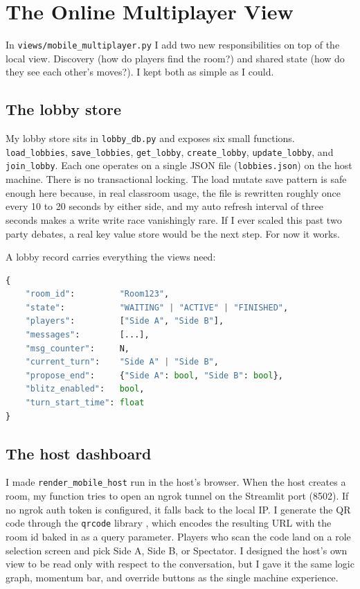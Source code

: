 \section{The Online Multiplayer View}
\label{sec:impl_online}
In \texttt{views/mobile\_multiplayer.py} I add two new responsibilities on top of the local view. Discovery (how do players find the room?) and shared state (how do they see each other's moves?). I kept both as simple as I could.

\subsection{The lobby store}
My lobby store sits in \texttt{lobby\_db.py} and exposes six small functions. \texttt{load\_lobbies}, \texttt{save\_lobbies}, \texttt{get\_lobby}, \texttt{create\_lobby}, \texttt{update\_lobby}, and \texttt{join\_lobby}. Each one operates on a single JSON file (\texttt{lobbies.json}) on the host machine. There is no transactional locking. The load mutate save pattern is safe enough here because, in real classroom usage, the file is rewritten roughly once every 10 to 20 seconds by either side, and my auto refresh interval of three seconds makes a write write race vanishingly rare. If I ever scaled this past two party debates, a real key value store would be the next step. For now it works.

A lobby record carries everything the views need:
\begin{lstlisting}[language=Python]
{
    "room_id":         "Room123",
    "state":           "WAITING" | "ACTIVE" | "FINISHED",
    "players":         ["Side A", "Side B"],
    "messages":        [...],
    "msg_counter":     N,
    "current_turn":    "Side A" | "Side B",
    "propose_end":     {"Side A": bool, "Side B": bool},
    "blitz_enabled":   bool,
    "turn_start_time": float
}
\end{lstlisting}

\subsection{The host dashboard}
I made \texttt{render\_mobile\_host} run in the host's browser. When the host creates a room, my function tries to open an ngrok tunnel \cite{ngrok2024} on the Streamlit port (8502). If no ngrok auth token is configured, it falls back to the local IP. I generate the QR code through the \texttt{qrcode} library \cite{qrcode2024}, which encodes the resulting URL with the room id baked in as a query parameter. Players who scan the code land on a role selection screen and pick Side A, Side B, or Spectator. I designed the host's own view to be read only with respect to the conversation, but I gave it the same logic graph, momentum bar, and override buttons as the single machine experience.

